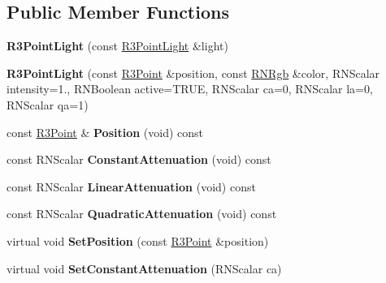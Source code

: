 \subsection*{Public Member Functions}
\begin{DoxyCompactItemize}
\item 
{\bfseries R3\+Point\+Light} (const \hyperlink{class_r3_point_light}{R3\+Point\+Light} \&light)\hypertarget{class_r3_point_light_a8c00c92ac2bc7675332659b5f7b021fb}{}\label{class_r3_point_light_a8c00c92ac2bc7675332659b5f7b021fb}

\item 
{\bfseries R3\+Point\+Light} (const \hyperlink{class_r3_point}{R3\+Point} \&position, const \hyperlink{class_r_n_rgb}{R\+N\+Rgb} \&color, R\+N\+Scalar intensity=1., R\+N\+Boolean active=T\+R\+UE, R\+N\+Scalar ca=0, R\+N\+Scalar la=0, R\+N\+Scalar qa=1)\hypertarget{class_r3_point_light_a843f6ecd1e8b072d27d53d28aea64ae0}{}\label{class_r3_point_light_a843f6ecd1e8b072d27d53d28aea64ae0}

\item 
const \hyperlink{class_r3_point}{R3\+Point} \& {\bfseries Position} (void) const \hypertarget{class_r3_point_light_a925bc8bff38aa48523fd290705144e6e}{}\label{class_r3_point_light_a925bc8bff38aa48523fd290705144e6e}

\item 
const R\+N\+Scalar {\bfseries Constant\+Attenuation} (void) const \hypertarget{class_r3_point_light_a5f8db531141372060935b04c1ae5d0c4}{}\label{class_r3_point_light_a5f8db531141372060935b04c1ae5d0c4}

\item 
const R\+N\+Scalar {\bfseries Linear\+Attenuation} (void) const \hypertarget{class_r3_point_light_a45e645b0d3fcc666f8fd52babed73203}{}\label{class_r3_point_light_a45e645b0d3fcc666f8fd52babed73203}

\item 
const R\+N\+Scalar {\bfseries Quadratic\+Attenuation} (void) const \hypertarget{class_r3_point_light_a77e2843354808cf08bf1acb8dac41f12}{}\label{class_r3_point_light_a77e2843354808cf08bf1acb8dac41f12}

\item 
virtual void {\bfseries Set\+Position} (const \hyperlink{class_r3_point}{R3\+Point} \&position)\hypertarget{class_r3_point_light_acfcc2477fe698f54c393e16006663eaa}{}\label{class_r3_point_light_acfcc2477fe698f54c393e16006663eaa}

\item 
virtual void {\bfseries Set\+Constant\+Attenuation} (R\+N\+Scalar ca)\hypertarget{class_r3_point_light_ac202e633a3c19aa721c6391a38fede38}{}\label{class_r3_point_light_ac202e633a3c19aa721c6391a38fede38}


\end{DoxyCompactItemize}
